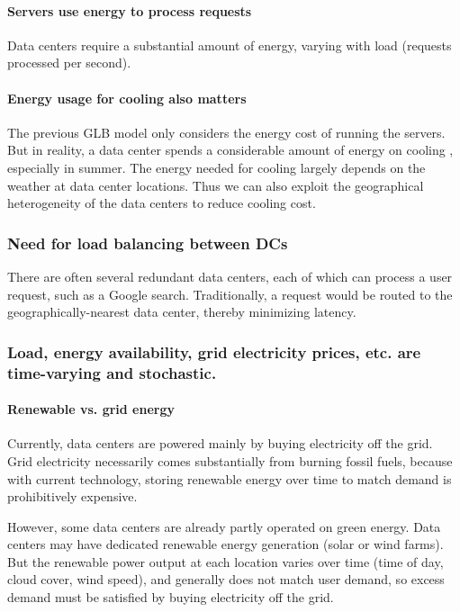 \documentclass{acm_proc_article-sp}
\begin{document}
		\paragraph{Servers use energy to process requests}
			Data centers require a substantial amount of energy, varying with load (requests processed per second).
		\paragraph{Energy usage for cooling also matters}
			
			The previous GLB model only considers the energy cost of running the servers. But in reality, a data center spends a considerable amount of energy on cooling \cite{datacenter}, especially in summer. The energy needed for cooling largely depends on the weather at data center locations. Thus we can also exploit the geographical heterogeneity of the data centers to reduce cooling cost.
	\subsubsection{Need for load balancing between DCs}
		There are often several redundant data centers, each of which can process a user request, such as a Google search. Traditionally, a request would be routed to the geographically-nearest data center, thereby minimizing latency.
	\subsubsection{Load, energy availability, grid electricity prices, etc. are time-varying and stochastic.}
		\paragraph{Renewable vs. grid energy}
			Currently, data centers are powered mainly by buying electricity off the grid. Grid electricity necessarily comes substantially from burning fossil fuels, because with current technology, storing renewable energy over time to match demand is prohibitively expensive.
			
			However, some data centers are already partly operated on green energy. Data centers may have dedicated renewable energy generation (solar or wind farms). But the renewable power output at each location varies over time (time of day, cloud cover, wind speed), and generally does not match user demand, so excess demand must be satisfied by buying electricity off the grid.
\end{document}
